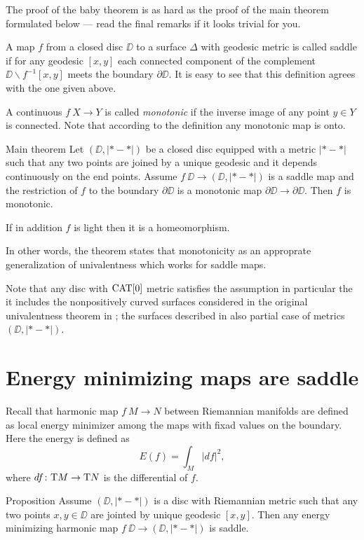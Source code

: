 \documentclass{article}
\begin{document}
The proof of the baby theorem is as hard as the proof of the main theorem formulated below --- read the final remarks if it looks trivial for you.

A map $f$ from a closed disc $\DD$ to a surface $\Delta$ with geodesic metric is called saddle if for any geodesic $[x,y]$ each connected component of the complement $\DD\backslash f^{-1}[x,y]$ meets the boundary $\partial\DD$.
It is easy to see that this definition agrees with the one given above.

A continuous  $f\:X\to Y$ is called \emph{monotonic} if the inverse image of any point $y\in Y$ is connected.
Note that according to the definition any monotonic map is onto.

\begin{thm}{Main theorem}
Let $(\DD,|{*}-{*}|)$ be a closed disc equipped with a metric $|{*}-{*}|$ such that any two points are joined by a unique geodesic and it depends continuously on the end points.
Assume $f\:\DD\to (\DD,|{*}-{*}|)$ is a saddle map and the restriction of $f$ to the boundary $\partial\DD$ is a monotonic map $\partial\DD\to  \partial\DD$.
Then $f$ is monotonic. 

If in addition $f$ is light then it is a homeomorphism.
\end{thm}

In other words, the theorem states that monotonicity as an approprate generalization of univalentness which works for saddle maps.

Note that any disc with $\mathop{\rm CAT}\nolimits[0]$ metric satisfies the assumption in particular the it includes the nonpositively curved surfaces considered in the original univalentness theorem in \cite{schoen-yau};
the surfaces described in \cite{jost} also partial case of metrics $(\DD,|{*}-{*}|)$.

\section{Energy minimizing maps are saddle}

Recall that harmonic map $f\:M\to N$ between Riemannian manifolds are defined as local energy minimizer among the maps with fixad values on the boundary.
Here the energy is defined as 
\[E(f)=\int_M|df|^2,\]
where $df\colon\mathrm{T} M\to \mathrm{T} N$ is the differential of $f$.

\begin{thm}{Proposition} 
Assume $(\DD,|{*}-{*}|)$ is a disc with Riemannian metric such that any two points $x,y\in\DD$ are jointed by unique geodesic $[x,y]$.
Then any energy minimizing harmonic map $f\:\DD\to(\DD,|{*}-{*}|)$ is saddle.
\end{thm}
\end{document}
